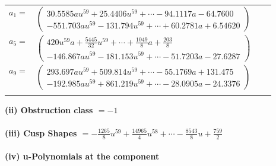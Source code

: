 \documentclass[1p]{elsarticle_modified}
\theoremstyle{definition}
\begin{document}
\begin{tabular}{m{7pt} m{180pt} m{7pt} m{180pt} }
\flushright $a_{1}=$&$\begin{pmatrix}30.5585 a u^{59}+25.4406 u^{59}+\cdots-94.1117 a-64.7600\\-551.703 a u^{59}-131.794 u^{59}+\cdots+60.2781 a+6.54620\end{pmatrix}$ \\
\flushright $a_{5}=$&$\begin{pmatrix}420 u^{59} a+\frac{5445}{32} u^{59}+\cdots+\frac{1049}{8} a+\frac{203}{8}\\-146.867 a u^{59}-181.153 u^{59}+\cdots-51.7203 a-27.6287\end{pmatrix}$ \\
\flushright $a_{9}=$&$\begin{pmatrix}293.697 a u^{59}+509.814 u^{59}+\cdots-55.1769 a+131.475\\-192.985 a u^{59}+861.219 u^{59}+\cdots-28.0905 a-24.3376\end{pmatrix}$\\&\end{tabular}
\flushleft \textbf{(ii) Obstruction class $= -1$}\\~\\
\flushleft \textbf{(iii) Cusp Shapes $= -\frac{1265}{8} u^{59}+\frac{14965}{4} u^{58}+\cdots-\frac{8543}{8} u+\frac{759}{2}$}\\~\\
\newpage\renewcommand{\arraystretch}{1}
\flushleft \textbf{(iv) u-Polynomials at the component}\newline \\
\end{document}
